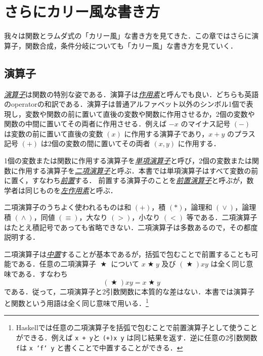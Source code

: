\documentclass[a4paper,draft]{jsbook}
\newcommand{\programminglanguage}[1]{\textsf{#1}}
\newcommand{\haskell}{\programminglanguage{Haskell}}
\newenvironment{leader}{\begingroup}{\endgroup}
\newcommand{\keyword}[1]{{\underline{\emph{#1}}}}
\newcommand{\code}[1]{\texttt{#1}}
\DeclareMathOperator{\mBinOp}{\bigstar}
\DeclareMathOperator{\mLogicalAnd}{\wedge}
\DeclareMathOperator{\mLogicalOr}{\vee}
\begin{document}
\chapter{さらにカリー風な書き方}

\begin{leader}
我々は関数とラムダ式の「カリー風」な書き方を見てきた．この章ではさらに演算子，関数合成，条件分岐についても「カリー風」な書き方を見ていく．
\end{leader}

\section{演算子}

\keyword{演算子}は関数の特別な姿である．演算子は\keyword{作用素}と呼んでも良い．どちらも英語のoperatorの和訳である．演算子は普通アルファベット以外のシンボル1個で表現し，変数や関数の前に置いて直後の変数や関数に作用させるか，2個の変数や関数の中間に置いてその両者に作用させる．例えば $-x$ のマイナス記号 $(-)$ は変数の前に置いて直後の変数 $(x)$ に作用する演算子であり，$x+y$ のプラス記号 $(+)$ は2個の変数の間に置いてその両者 $(x,y)$ に作用する．

1個の変数または関数に作用する演算子を\keyword{単項演算子}と呼び，2個の変数または関数に作用する演算子を\keyword{二項演算子}と呼ぶ．本書では単項演算子はすべて変数の前に置く，すなわち\keyword{前置}する．
前置する演算子のことを\keyword{前置演算子}と呼ぶが，数学者は同じものを\keyword{左作用素}と呼ぶ．

二項演算子のうちよく使われるものは和 $(+)$，積 $(*)$，論理和 $(\mLogicalOr)$，論理積 $(\mLogicalAnd)$，同値 $(\equiv)$，大なり $(>)$，小なり $(<)$ 等である．二項演算子はたとえ積記号であっても省略できない．二項演算子は多数あるので，その都度説明する．

二項演算子は\keyword{中置}することが基本であるが，括弧で包むことで前置することも可能である．任意の二項演算子 $\mBinOp$ について $x\mBinOp y$ 及び $(\mBinOp)xy$ は全く同じ意味である．すなわち
\begin{equation}
\left(\mBinOp\right)xy=x\mBinOp y
\end{equation}
である．従って，二項演算子と2引数関数に本質的な差はない．本書では演算子と関数という用語は全く同じ意味で用いる．\footnote{\haskell では任意の二項演算子を括弧で包むことで前置演算子として使うことができる．例えば \code{x + y}と \code{(+)x y} は同じ結果を返す．逆に任意の2引数関数 \code{f}は \code{x `f` y} と書くことで中置することができる．}
\end{document}
